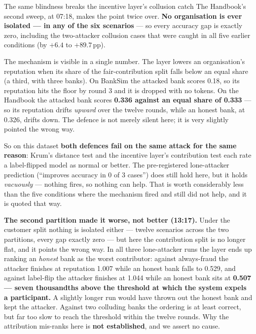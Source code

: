 \documentclass[11pt]{article}
\begin{document}
\begin{warnbox}{The same blindness breaks the incentive layer's collusion catch}
The Handbook's second sweep, at 07:18, makes the point twice over. \textbf{No organisation is ever
isolated --- in any of the six scenarios} --- so every accuracy gap is exactly zero, including the
two-attacker collusion cases that were caught in all five earlier conditions (by $+6.4$ to $+89.7$\,pp).

The mechanism is visible in a single number. The layer lowers an organisation's reputation when its share
of the fair-contribution split falls below an equal share (a third, with three banks). On BankSim the
attacked bank scores 0.18, so its reputation hits the floor by round 3 and it is dropped with no tokens.
On the Handbook the attacked bank scores \textbf{0.336 against an equal share of 0.333} --- so its
reputation drifts \emph{upward} over the twelve rounds, while an honest bank, at 0.326, drifts down. The
defence is not merely silent here; it is very slightly pointed the wrong way.

So on this dataset \textbf{both defences fail on the same attack for the same reason}: Krum's distance
test and the incentive layer's contribution test each rate a label-flipped model as normal or better. The
pre-registered lone-attacker prediction (``improves accuracy in 0 of 3 cases'') does still hold here, but
it holds \emph{vacuously} --- nothing fires, so nothing can help. That is worth considerably less than the
five conditions where the mechanism fired and still did not help, and it is quoted that way.

\textbf{The second partition made it worse, not better (13:17).} Under the customer split nothing is
isolated either --- twelve scenarios across the two partitions, every gap exactly zero --- but here the
contribution split is no longer flat, and it points the wrong way. In all three lone-attacker runs the
layer ends up ranking an \emph{honest} bank as the worst contributor: against always-fraud the attacker
finishes at reputation 1.007 while an honest bank falls to 0.529, and against label-flip the attacker
finishes at 1.044 while an honest bank sits at \textbf{0.507 --- seven thousandths above the threshold at
which the system expels a participant.} A slightly longer run would have thrown out the honest bank and
kept the attacker. Against two colluding banks the ordering is at least correct, but far too slow to reach
the threshold within the twelve rounds. Why the attribution mis-ranks here is \textbf{not established},
and we assert no cause.
\end{warnbox}
\end{document}
